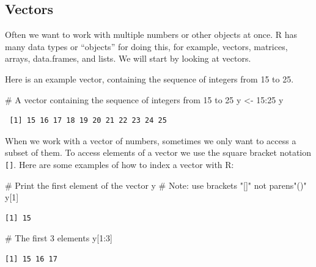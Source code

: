 \documentclass[
  letterpaper,
  DIV=11,
  numbers=noendperiod]{scrreprt}
\newenvironment{Shaded}{\begin{snugshade}}{\end{snugshade}}
\newcommand{\CommentTok}[1]{\textcolor[rgb]{0.37,0.37,0.37}{#1}}
\newcommand{\DecValTok}[1]{\textcolor[rgb]{0.68,0.00,0.00}{#1}}
\newcommand{\NormalTok}[1]{\textcolor[rgb]{0.00,0.23,0.31}{#1}}
\newcommand{\OtherTok}[1]{\textcolor[rgb]{0.00,0.23,0.31}{#1}}
\newcommand{\SpecialCharTok}[1]{\textcolor[rgb]{0.37,0.37,0.37}{#1}}
\begin{document}
\hypertarget{vectors}{%
\subsection{Vectors}\label{vectors}}

Often we want to work with multiple numbers or other objects at once. R
has many data types or ``objects'' for doing this, for example, vectors,
matrices, arrays, data.frames, and lists. We will start by looking at
vectors.

Here is an example vector, containing the sequence of integers from 15
to 25.

\begin{Shaded}
\begin{Highlighting}[]
\CommentTok{\# A vector containing the sequence of integers from 15 to 25}
\NormalTok{y }\OtherTok{\textless{}{-}} \DecValTok{15}\SpecialCharTok{:}\DecValTok{25}
\NormalTok{y}
\end{Highlighting}
\end{Shaded}

\begin{verbatim}
 [1] 15 16 17 18 19 20 21 22 23 24 25
\end{verbatim}

When we work with a vector of numbers, sometimes we only want to access
a subset of them. To access elements of a vector we use the square
bracket notation \texttt{{[}{]}}. Here are some examples of how to index
a vector with R:

\begin{Shaded}
\begin{Highlighting}[]
\CommentTok{\# Print the first element of the vector y}
\CommentTok{\# Note: use brackets "[]" not parens"()"}
\NormalTok{y[}\DecValTok{1}\NormalTok{]}
\end{Highlighting}
\end{Shaded}

\begin{verbatim}
[1] 15
\end{verbatim}

\begin{Shaded}
\begin{Highlighting}[]
\CommentTok{\# The first 3 elements}
\NormalTok{y[}\DecValTok{1}\SpecialCharTok{:}\DecValTok{3}\NormalTok{]}
\end{Highlighting}
\end{Shaded}

\begin{verbatim}
[1] 15 16 17
\end{verbatim}
\end{document}
